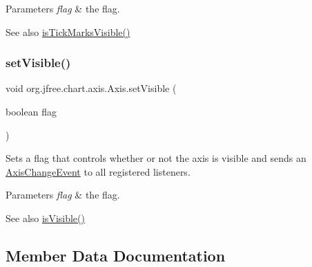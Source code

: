 \begin{DoxyParams}{Parameters}
{\em flag} & the flag.\\
\hline
\end{DoxyParams}
\begin{DoxySeeAlso}{See also}
\mbox{\hyperlink{classorg_1_1jfree_1_1chart_1_1axis_1_1_axis_ad1eb8269abe3384082e89700eaea08d0}{is\+Tick\+Marks\+Visible()}} 
\end{DoxySeeAlso}
\mbox{\label{classorg_1_1jfree_1_1chart_1_1axis_1_1_axis_aa76bd373dd5f03f842bbef81e65c2eba}} 
\subsubsection{\texorpdfstring{set\+Visible()}{setVisible()}}
{\footnotesize\ttfamily void org.\+jfree.\+chart.\+axis.\+Axis.\+set\+Visible (\begin{DoxyParamCaption}\item[{boolean}]{flag }\end{DoxyParamCaption})}

Sets a flag that controls whether or not the axis is visible and sends an \mbox{\hyperlink{}{Axis\+Change\+Event}} to all registered listeners.


\begin{DoxyParams}{Parameters}
{\em flag} & the flag.\\
\hline
\end{DoxyParams}
\begin{DoxySeeAlso}{See also}
\mbox{\hyperlink{classorg_1_1jfree_1_1chart_1_1axis_1_1_axis_ab40987e53712a299b588e23effa22f90}{is\+Visible()}} 
\end{DoxySeeAlso}


\subsection{Member Data Documentation}
\mbox{\label{classorg_1_1jfree_1_1chart_1_1axis_1_1_axis_a3529ec9431166e1d6f19d1b8d482bb82}} 
